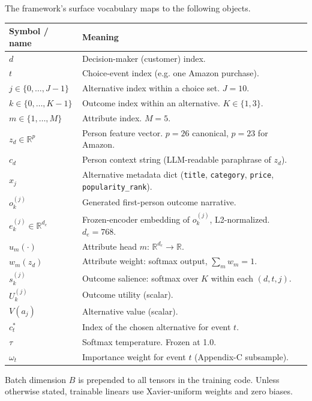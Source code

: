 \documentclass[11pt,a4paper]{article}
\begin{document}
The framework's surface vocabulary maps to the following objects.

\begin{center}
\small
\begin{tabularx}{\textwidth}{@{}l X@{}}
\toprule
Symbol / name & Meaning \\
\midrule
$d$               & Decision-maker (customer) index. \\
$t$               & Choice-event index (e.g. one Amazon purchase). \\
$j \in \{0,\dots,J{-}1\}$ & Alternative index within a choice set. $J = 10$. \\
$k \in \{0,\dots,K{-}1\}$ & Outcome index within an alternative. $K \in \{1,3\}$. \\
$m \in \{1,\dots,M\}$ & Attribute index. $M = 5$. \\
$z_d \in \mathbb{R}^p$ & Person feature vector. $p = 26$ canonical, $p = 23$ for Amazon. \\
$c_d$             & Person context string (LLM-readable paraphrase of $z_d$). \\
$x_j$             & Alternative metadata dict (\texttt{title}, \texttt{category}, \texttt{price}, \texttt{popularity\_rank}). \\
$o_k^{(j)}$       & Generated first-person outcome narrative. \\
$e_k^{(j)} \in \mathbb{R}^{d_e}$ & Frozen-encoder embedding of $o_k^{(j)}$, L2-normalized. $d_e = 768$. \\
$u_m(\cdot)$      & Attribute head $m$: $\mathbb{R}^{d_e} \to \mathbb{R}$. \\
$w_m(z_d)$        & Attribute weight: softmax output, $\sum_m w_m = 1$. \\
$s_k^{(j)}$       & Outcome salience: softmax over $K$ within each $(d, t, j)$. \\
$U_k^{(j)}$       & Outcome utility (scalar). \\
$V(a_j)$          & Alternative value (scalar). \\
$c^*_t$           & Index of the chosen alternative for event $t$. \\
$\tau$            & Softmax temperature. Frozen at 1.0. \\
$\omega_t$        & Importance weight for event $t$ (Appendix-C subsample). \\
\bottomrule
\end{tabularx}
\end{center}

Batch dimension $B$ is prepended to all tensors in the training code.
Unless otherwise stated, trainable linears use Xavier-uniform weights
and zero biases.
\end{document}
